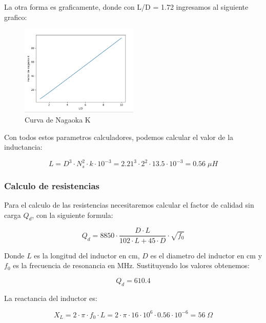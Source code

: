La otra forma es graficamente, donde con L/D = 1.72 ingresamos al siguiente grafico:

\begin{figure}[h]
    \centering
    \includegraphics[width=0.5\textwidth]{Imagenes/factorNagaoka.png}
    \caption{Curva de Nagaoka K}
\end{figure}

Con todos estos parametros calculadores, podemos calcular el valor de la inductancia:

\begin{equation}
    L = D^3 \cdot N_s^2 \cdot k \cdot 10^{-3} = 2.21^3 \cdot 2^2 \cdot 13.5 \cdot 10^{-3} = 0.56\; \mu H
\end{equation}

\subsubsection{Calculo de resistencias}

Para el calculo de las resistencias necesitaremos calcular el factor de calidad sin carga $Q_d$, con la siguiente formula:

\begin{equation}
    Q_d = 8850 \cdot \frac{D \cdot L}{102 \cdot L + 45 \cdot D} \cdot \sqrt{f_0}
\end{equation}

Donde $L$ es la longitud del inductor en cm, $D$ es el diametro del inductor en cm y $f_0$ es la frecuencia de resonancia en MHz. Sustituyendo los valores obtenemos:

\begin{equation}
    Q_d = 610.4 
\end{equation}

La reactancia del inductor es:

\begin{equation}
    X_L = 2 \cdot \pi \cdot f_0 \cdot L = 2 \cdot \pi \cdot 16 \cdot 10^6 \cdot 0.56 \cdot 10^{-6} = 56\; \Omega
\end{equation}

